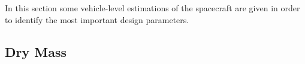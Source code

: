









In this section some vehicle-level estimations of the spacecraft are
given in order to identify the most important design parameters.

\subsection{Dry Mass}


